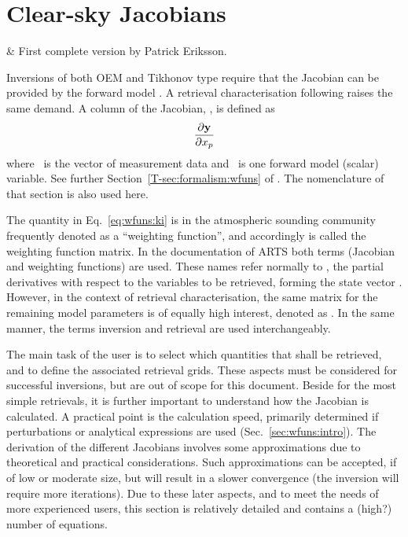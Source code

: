 \chapter{Clear-sky Jacobians}
 \label{sec:wfuns}

  & First complete version by Patrick Eriksson.\\
 \stophistory

\graphicspath{{Figs/wfuns/}}


Inversions of both OEM and Tikhonov type require that the Jacobian can be
provided by the forward model \citep[see e.g.][]{eriksson:analy:00}. A
retrieval characterisation following \citet{rodgers:90,rodgers:00} raises the
same demand. A column of the Jacobian, \aWfnMtr{\SttVct}, is defined as
\begin{equation}
  \frac{\partial\mathbf{y}}{\partial x_{p}}
  \label{eq:wfuns:ki}
\end{equation}
where \MsrVct\ is the vector of measurement data and \ is one forward
model (scalar) variable. See further Section~\ref{T-sec:formalism:wfuns} of
\theory. The nomenclature of that section is also used here.

The quantity in Eq.~\ref{eq:wfuns:ki} is in the atmospheric sounding
community frequently denoted as a ``weighting function'', and accordingly
\aWfnMtr{\SttVct} is called the weighting function matrix. In the documentation
of ARTS both terms (Jacobian and weighting functions) are used. These names
refer normally to \aWfnMtr{\SttVct}, the partial derivatives with respect to
the variables to be retrieved, forming the state vector \SttVct. However, in
the context of retrieval characterisation, the same matrix for the remaining
model parameters is of equally high interest, denoted as \aWfnMtr{\FrwMdlVct}.
In the same manner, the terms inversion and retrieval are used interchangeably.

The main task of the user is to select which quantities that shall be
retrieved, and to define the associated retrieval grids. These aspects must be
considered for successful inversions, but are out of scope for this document.
Beside for the most simple retrievals, it is further important to understand
how the Jacobian is calculated. A practical point is the calculation speed,
primarily determined if perturbations or analytical expressions are used
(Sec.~\ref{sec:wfuns:intro}). The derivation of the different Jacobians
involves some approximations due to theoretical and practical considerations.
Such approximations can be accepted, if of low or moderate size, but will
result in a slower convergence (the inversion will require more iterations).
Due to these later aspects, and to meet the needs of more experienced users,
this section is relatively detailed and contains a (high?) number of equations.

